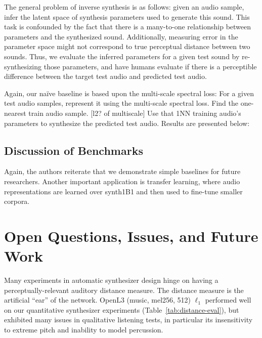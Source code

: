 The general problem of inverse synthesis is as follows: given an audio sample, infer the latent space of synthesis parameters used to generate this sound. This task is confounded by the fact that there is a many-to-one relationship between parameters and the synthesized sound. Additionally, measuring error in the parameter space might not correspond to true perceptual distance between two sounds. Thus, we evaluate the inferred parameters for a given test sound by re-synthesizing those parameters, and have humans evaluate if there is a perceptible difference between the target test audio and predicted test audio.


Again, our na\"{i}ve baseline is based upon the multi-scale spectral loss: For a given test audio samples, represent it using the multi-scale spectral loss. Find the one-nearest train audio sample. [l2? of multiscale] Use that 1NN training audio's parameters to synthesize the predicted test audio. Results are presented below:


\subsection{Discussion of Benchmarks}

Again, the authors reiterate that we demonstrate simple baselines for future researchers. Another important application is transfer learning, where audio representations are learned over synth1B1 and then used to fine-tune smaller corpora.
\fi


\section{Open Questions, Issues, and Future Work}
\label{sec:issues}


Many experiments in automatic synthesizer design hinge on having a perceptually-relevant auditory distance measure. The distance measure is the artificial ``ear'' of the network.
OpenL3 (music, mel256, 512) $\ell_1$ performed well on our quantitative synthesizer experiments (Table~\ref{tab:distance-eval}), but exhibited many issues in qualitative listening tests, in particular its insensitivity to extreme pitch and inability to model percussion.

